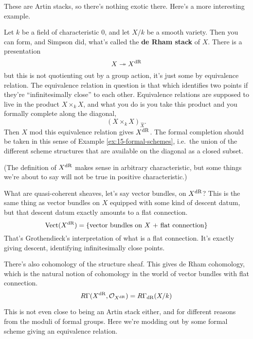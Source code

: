 These are Artin stacks, so there's nothing exotic there. Here's a more interesting example.

\begin{example}
  \label{ex:15-dR}
  Let $k$ be a field of characteristic $0$, and let $X/k$ be a smooth variety. Then you can form, and Simpson did, what's called the \textbf{de Rham stack} of $X$. There is a presentation
  \[ X \twoheadrightarrow X^{\mathrm{dR}} \]
  but this is not quotienting out by a group action, it's just some by equivalence relation. The equivalence relation in question is that which identifies two points if they're ``infinitesimally close'' to each other. Equivalence relations are supposed to live in the product $X\times_k X$, and what you do is you take this product and you formally complete along the diagonal,
  \[ (X\times_k X)_{\widehat X}. \]
  Then $X$ mod this equivalence relation gives $X^{\mathrm{dR}}$. The formal completion should be taken in this sense of Example \ref{ex:15-formal-schemes}, i.e.\ the union of the different scheme structures that are available on the diagonal as a closed subset.

  (The definition of $X^{\mathrm{dR}}$ makes sense in arbitrary characteristic, but some things we're about to say will not be true in positive characteristic.)

  What are quasi-coherent sheaves, let's say vector bundles, on $X^{\mathrm{dR}}$? This is the same thing as vector bundles on $X$ equipped with some kind of descent datum, but that descent datum exactly amounts to a flat connection.
  \[ \text{Vect}(X^{\mathrm{dR}}) = \{\text{vector bundles on $X$ + flat connection}\} \]
  That's Grothendieck's interpretation of what is a flat connection. It's exactly giving descent, identifying infinitesimally close points.
  
  There's also cohomology of the structure sheaf. This gives de Rham cohomology, which is the natural notion of cohomology in the world of vector bundles with flat connection.
  \[ R\Gamma(X^{\mathrm{dR}}, \mathcal O_{X^{\mathrm{dR}}}) = R\Gamma_{\mathrm{dR}}(X/k) \]

  This is not even close to being an Artin stack either, and for different reasons from the moduli of formal groups. Here we're modding out by some formal scheme giving an equivalence relation.
\end{example}

